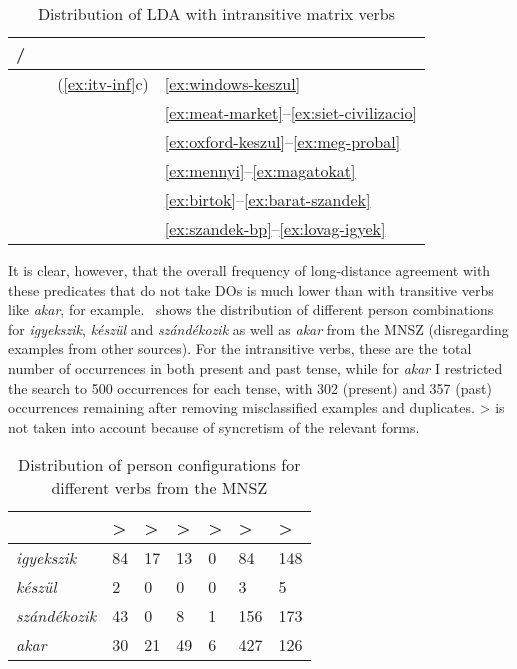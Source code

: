 \begin{table}[htpb]
    \centering
    \begin{tabular}{llll}
    \toprule
    \Sbj{} / \Obj{} & \First{} & \Second{}           & \Third{} \\
    \midrule
    \Fsg{}          &          & (\ref{ex:itv-inf}c) & \eqref{ex:windows-keszul} \\
    \Fpl{}          &          &                     & \eqref{ex:meat-market}--\eqref{ex:siet-civilizacio}\\
    \Ssg{}          &          &                     & \eqref{ex:oxford-keszul}--\eqref{ex:meg-probal}\\
    \Spl{}          &          &                     & \eqref{ex:mennyi}--\eqref{ex:magatokat} \\
    \Tsg{}          &          &                     & \eqref{ex:birtok}--\eqref{ex:barat-szandek} \\
    \Tpl{}          &          &                     & \eqref{ex:szandek-bp}--\eqref{ex:lovag-igyek} \\
    \bottomrule
    \end{tabular}
    \caption{Distribution of LDA with intransitive matrix
    verbs}\label{tb:lda-distr}
\end{table}

It is clear, however, that the overall frequency of long-distance agreement
with these predicates that do not take \Acc{} \glspl{DO} is much lower than
with transitive verbs like \emph{akar}, for
example.~ shows the distribution of different
person combinations for \emph{igyekszik}, \emph{készül} and
\emph{szán\-dé\-kozik} as well as \emph{akar} from the \gls{MNSZ} (disregarding
examples from other sources). For the intransitive verbs, these are the total
number of occurrences in both present and past tense, while for \emph{akar} I
restricted the search to 500 occurrences for each tense, with 302 (present) and
357 (past) occurrences remaining after removing misclassified examples and
duplicates. \Fsg>\Third{} is not taken into account because of syncretism of
the relevant forms.

\begin{table}[htpb]
    \centering
    \begin{tabular}{lllllll}
    \toprule
        & \Fpl{}>\Third{} & \Fsg{}>\Second{} & \Ssg{}>\Third{} & \Spl{}>\Third{} & \Tsg{}>\Third{} & \Tpl{}>\Third{} \\
    \midrule
    \emph{igyekszik} & 84 & 17 & 13 & 0 & 84 & 148\\
    \emph{készül} & 2 & 0 & 0 & 0 & 3 & 5 \\
    \emph{szándékozik} & 43 & 0 & 8 & 1 & 156 & 173\\
    \midrule
    \emph{akar} & 30 & 21 & 49 & 6 & 427 & 126\\
    \bottomrule
    \end{tabular}
    \caption{Distribution of person configurations for different verbs
    from the \gls{MNSZ}}\label{tb:mnsz-person-counts}
\end{table}

